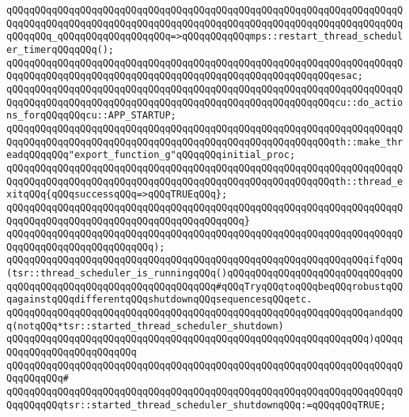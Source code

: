 \verb|qQQqqQQqqQQqqQQqqQQqqQQqqQQqqQQqqQQqqQQqqQQqqQQqqQQqqQQqqQQqqQQqqQQqqQQqqQQqqQQqqQQqqQQqqQQqqQQqqQQqqQQqqQQqqQQqqQQqqQQqqQQqqQQqqQQqqQQqqQQqqQQqqQQq_qQQqqQQqqQQqqQQqqQQq=>qQQqqQQqqQQqmps::restart_thread_scheduler_timerqQQqqQQq();|\newline
\verb|qQQqqQQqqQQqqQQqqQQqqQQqqQQqqQQqqQQqqQQqqQQqqQQqqQQqqQQqqQQqqQQqqQQqqQQqqQQqqQQqqQQqqQQqqQQqqQQqqQQqqQQqqQQqqQQqqQQqqQQqqQQqqQQqesac;|\newline
\newline
\verb|qQQqqQQqqQQqqQQqqQQqqQQqqQQqqQQqqQQqqQQqqQQqqQQqqQQqqQQqqQQqqQQqqQQqqQQqqQQqqQQqqQQqqQQqqQQqqQQqqQQqqQQqqQQqqQQqqQQqqQQqqQQqqQQqcu::do_actions_forqQQqqQQqcu::APP_STARTUP;|\newline
\newline
\verb|qQQqqQQqqQQqqQQqqQQqqQQqqQQqqQQqqQQqqQQqqQQqqQQqqQQqqQQqqQQqqQQqqQQqqQQqqQQqqQQqqQQqqQQqqQQqqQQqqQQqqQQqqQQqqQQqqQQqqQQqqQQqqQQqth::make_threadqQQqqQQq"export_function_g"qQQqqQQqinitial_proc;|\newline
\newline
\verb|qQQqqQQqqQQqqQQqqQQqqQQqqQQqqQQqqQQqqQQqqQQqqQQqqQQqqQQqqQQqqQQqqQQqqQQqqQQqqQQqqQQqqQQqqQQqqQQqqQQqqQQqqQQqqQQqqQQqqQQqqQQqqQQqth::thread_exitqQQq{qQQqsuccessqQQq=>qQQqTRUEqQQq};|\newline
\verb|qQQqqQQqqQQqqQQqqQQqqQQqqQQqqQQqqQQqqQQqqQQqqQQqqQQqqQQqqQQqqQQqqQQqqQQqqQQqqQQqqQQqqQQqqQQqqQQqqQQqqQQqqQQqqQQq}|\newline
\verb|qQQqqQQqqQQqqQQqqQQqqQQqqQQqqQQqqQQqqQQqqQQqqQQqqQQqqQQqqQQqqQQqqQQqqQQqqQQqqQQqqQQqqQQqqQQqqQQq);|\newline
\newline
\verb|qQQqqQQqqQQqqQQqqQQqqQQqqQQqqQQqqQQqqQQqqQQqqQQqqQQqqQQqqQQqqQQqifqQQq(tsr::thread_scheduler_is_runningqQQq()qQQqqQQqqQQqqQQqqQQqqQQqqQQqqQQqqQQqqQQqqQQqqQQqqQQqqQQqqQQqqQQqqQQq#qQQqTryqQQqtoqQQqbeqQQqrobustqQQqagainstqQQqdifferentqQQqshutdownqQQqsequencesqQQqetc.|\newline
\verb|qQQqqQQqqQQqqQQqqQQqqQQqqQQqqQQqqQQqqQQqqQQqqQQqqQQqqQQqqQQqqQQqandqQQq(notqQQq*tsr::started_thread_scheduler_shutdown)|\newline
\verb|qQQqqQQqqQQqqQQqqQQqqQQqqQQqqQQqqQQqqQQqqQQqqQQqqQQqqQQqqQQqqQQq)qQQqqQQqqQQqqQQqqQQqqQQqqQQq|\newline
\verb|qQQqqQQqqQQqqQQqqQQqqQQqqQQqqQQqqQQqqQQqqQQqqQQqqQQqqQQqqQQqqQQqqQQqqQQqqQQqqQQq#|\newline
\verb|qQQqqQQqqQQqqQQqqQQqqQQqqQQqqQQqqQQqqQQqqQQqqQQqqQQqqQQqqQQqqQQqqQQqqQQqqQQqqQQqtsr::started_thread_scheduler_shutdownqQQq:=qQQqqQQqTRUE;|\newline
